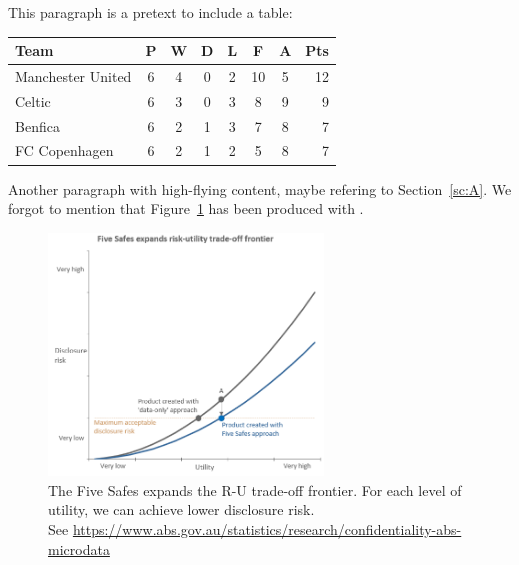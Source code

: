 \documentclass[a4paper,11pt]{style/uneceart}
\begin{document}
This paragraph is a pretext to include a table:

\begin{tabular}{l*{6}{c}r}
Team              & P & W & D & L & F  & A & Pts \\
\hline
Manchester United & 6 & 4 & 0 & 2 & 10 & 5 & 12  \\
Celtic            & 6 & 3 & 0 & 3 &  8 & 9 &  9  \\
Benfica           & 6 & 2 & 1 & 3 &  7 & 8 &  7  \\
FC Copenhagen     & 6 & 2 & 1 & 2 &  5 & 8 &  7  \\
\end{tabular}


Another paragraph with high-flying content, maybe refering to
Section~\ref{sc:A}. We forgot to mention that
Figure~\ref{plot:1}  has been produced with \R .

\begin{figure}[ht]
\begin{center}
\includegraphics[width=0.65\textwidth]{figures/RU-5safes.png}
\caption{\label{plot:1}The Five Safes expands the R-U trade-off frontier. For each level of utility, we can achieve lower disclosure risk.\\
See \small{\url{https://www.abs.gov.au/statistics/research/confidentiality-abs-microdata}}}
\end{center}
\end{figure}



\end{document}
